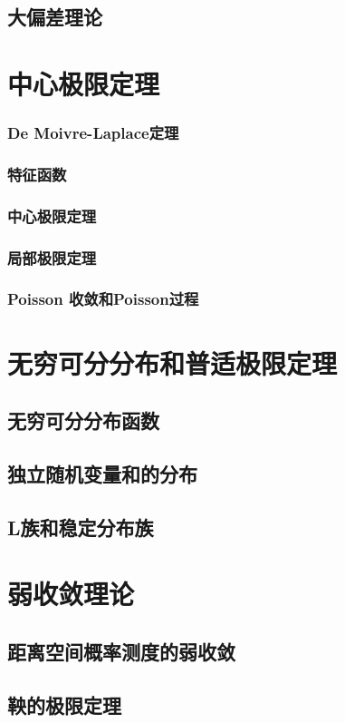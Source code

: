 	\section{大偏差理论}

\chapter{中心极限定理}
	\subsection{De Moivre-Laplace定理}
	\subsection{特征函数}
	\subsection{中心极限定理}
	\subsection{局部极限定理}
	\subsection{Poisson 收敛和Poisson过程}

\chapter{无穷可分分布和普适极限定理}
	\section{无穷可分分布函数}
	\section{独立随机变量和的分布}
	\section{L族和稳定分布族}
	
\chapter{弱收敛理论}
	\section{距离空间概率测度的弱收敛}
	\section{鞅的极限定理}
	
